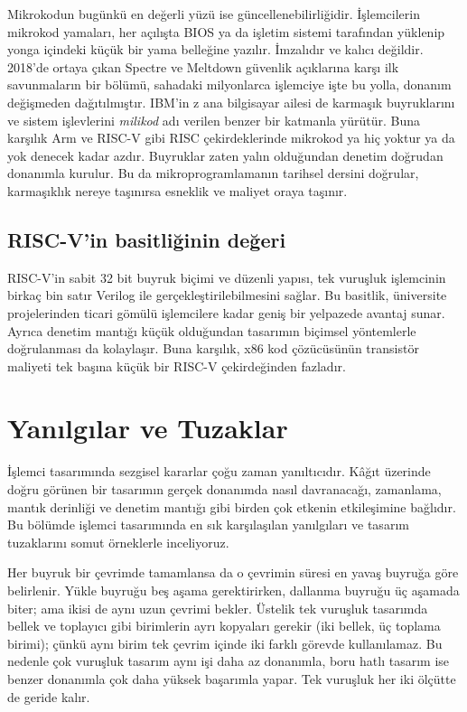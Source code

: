 Mikrokodun bugünkü en değerli yüzü ise güncellenebilirliğidir. İşlemcilerin mikrokod yamaları, her açılışta BIOS ya da işletim sistemi tarafından yüklenip yonga içindeki küçük bir yama belleğine yazılır. İmzalıdır ve kalıcı değildir. 2018'de ortaya çıkan Spectre ve Meltdown güvenlik açıklarına karşı ilk savunmaların bir bölümü, sahadaki milyonlarca işlemciye işte bu yolla, donanım değişmeden dağıtılmıştır. IBM'in z ana bilgisayar ailesi de karmaşık buyruklarını ve sistem işlevlerini \emph{milikod} adı verilen benzer bir katmanla yürütür. Buna karşılık Arm ve RISC-V gibi RISC çekirdeklerinde mikrokod ya hiç yoktur ya da yok denecek kadar azdır. Buyruklar zaten yalın olduğundan denetim doğrudan donanımla kurulur. Bu da mikroprogramlamanın tarihsel dersini doğrular, karmaşıklık nereye taşınırsa esneklik ve maliyet oraya taşınır.

\subsection{RISC-V'in basitliğinin değeri}
RISC-V'in sabit 32 bit buyruk biçimi ve düzenli yapısı, tek vuruşluk işlemcinin birkaç bin satır Verilog ile gerçekleştirilebilmesini sağlar. Bu basitlik, üniversite projelerinden ticari gömülü işlemcilere kadar geniş bir yelpazede avantaj sunar. Ayrıca denetim mantığı küçük olduğundan tasarımın biçimsel yöntemlerle doğrulanması da kolaylaşır. Buna karşılık, x86 kod çözücüsünün transistör maliyeti tek başına küçük bir RISC-V çekirdeğinden fazladır.



\section{Yanılgılar ve Tuzaklar}
\label{sec:islemci-yanilgilar}

İşlemci tasarımında sezgisel kararlar çoğu zaman yanıltıcıdır. Kâğıt üzerinde doğru görünen bir tasarımın gerçek donanımda nasıl davranacağı, zamanlama, mantık derinliği ve denetim mantığı gibi birden çok etkenin etkileşimine bağlıdır. Bu bölümde işlemci tasarımında en sık karşılaşılan yanılgıları ve tasarım tuzaklarını somut örneklerle inceliyoruz.

Her buyruk bir çevrimde tamamlansa da o çevrimin süresi en yavaş buyruğa göre belirlenir. Yükle buyruğu beş aşama gerektirirken, dallanma buyruğu üç aşamada biter; ama ikisi de aynı uzun çevrimi bekler. Üstelik tek vuruşluk tasarımda bellek ve toplayıcı gibi birimlerin ayrı kopyaları gerekir (iki bellek, üç toplama birimi); çünkü aynı birim tek çevrim içinde iki farklı görevde kullanılamaz. Bu nedenle çok vuruşluk tasarım aynı işi daha az donanımla, boru hatlı tasarım ise benzer donanımla çok daha yüksek başarımla yapar. Tek vuruşluk her iki ölçütte de geride kalır.

